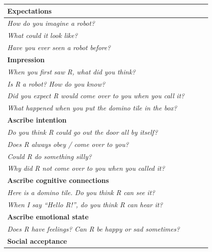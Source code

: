 \documentclass{sig-alternate}
\begin{document}
\begin{table}[h!t]
\centering
\footnotesize
\begin{tabular}{p{0.9\linewidth}}
    \toprule
    \textbf{Expectations} \\
    \midrule

    \emph{How do you imagine a robot?} \\
    \emph{What could it look like?} \\
    \emph{Have you ever seen a robot before?} \\

    \toprule
    \textbf{Impression} \\
    \midrule


    \emph{When you first saw R, what did you think?} \\
    \emph{Is R a robot? How do you know?} \\
    \emph{Did you expect R would come over to you when you call it?} \\
    \emph{What happened when you put the domino tile in the box?} \\

    \toprule
    \textbf{Ascribe intention} \\
    \midrule


    \emph{Do you think R could go out the door all by itself?} \\	
    \emph{Does R always obey / come over to you?} \\
    \emph{Could R do something silly?} \\
    \emph{Why did R not come over to you when you called it?} \\

    \toprule
    \textbf{Ascribe cognitive connections} \\
    \midrule


    \emph{Here is a domino tile. Do you think R can see it?} \\ 
    \emph{When I say \textit{``Hello R!''}, do you think R can hear it?} \\

    \toprule
    \textbf{Ascribe emotional state} \\
    \midrule


    \emph{Does R have feelings? Can R be happy or sad sometimes?} \\

    \toprule
    \textbf{Social acceptance} \\
    \midrule



\end{tabular}
\end{table}
\end{document}
